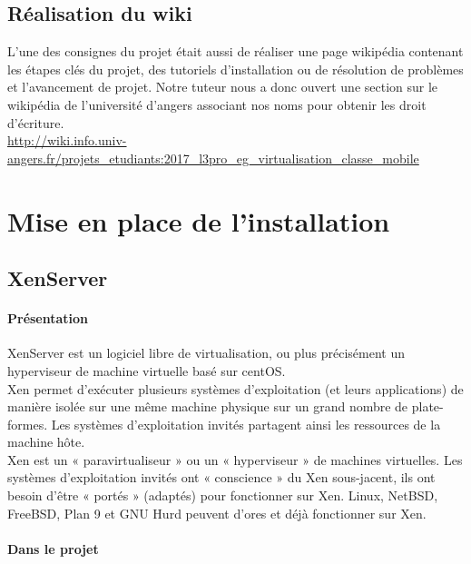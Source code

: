 \documentclass[a4paper,12pt]{extarticle}
\begin{document}
\clearpage

\subsection{Réalisation du wiki}

L’une des consignes du projet était aussi de réaliser une page wikipédia contenant les étapes clés du projet, des tutoriels d’installation ou de résolution de problèmes et l’avancement de projet.\newline
Notre tuteur nous a donc ouvert une section sur le wikipédia de l’université d’angers associant nos noms pour obtenir les droit d’écriture.\\

\url{http://wiki.info.univ-angers.fr/projets_etudiants:2017_l3pro_eg_virtualisation_classe_mobile}

\clearpage

\section{Mise en place de l'installation}
\subsection{XenServer}
\paragraph{Présentation\\}


XenServer est un logiciel libre de virtualisation, ou plus précisément un hyperviseur de machine virtuelle basé sur centOS.\\

Xen permet d'exécuter plusieurs systèmes d'exploitation (et leurs applications) de manière isolée sur une même machine physique sur un grand nombre de plate-formes. Les systèmes d'exploitation invités partagent ainsi les ressources de la machine hôte.\\

Xen est un « paravirtualiseur » ou un « hyperviseur » de machines virtuelles. Les systèmes d'exploitation invités ont « conscience » du Xen sous-jacent, ils ont besoin d'être « portés » (adaptés) pour fonctionner sur Xen. Linux, NetBSD, FreeBSD, Plan 9 et GNU Hurd peuvent d'ores et déjà fonctionner sur Xen.\\

\paragraph{Dans le projet\\}
\end{document}
